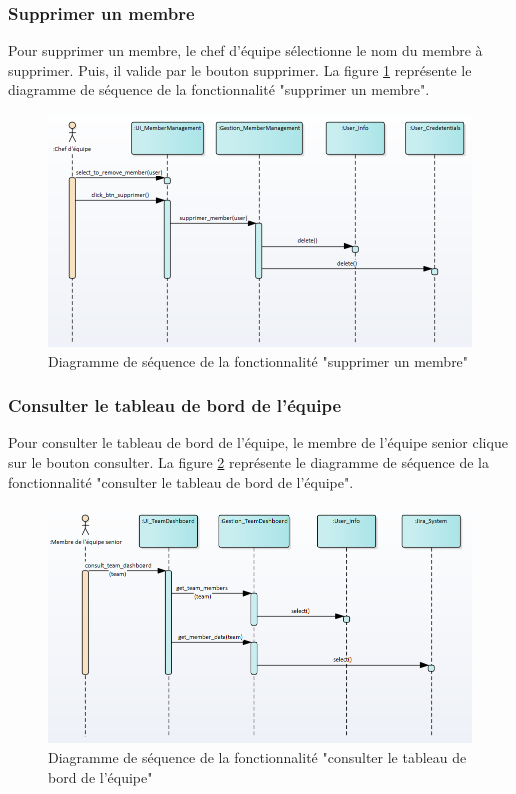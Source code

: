 \subsubsection{Supprimer un membre}
Pour supprimer un membre, le chef d'équipe sélectionne le nom du membre à supprimer. Puis, il valide par le bouton supprimer.
La figure \ref{code73} représente le diagramme de séquence de la fonctionnalité "supprimer un membre".
\begin{figure}[H]
  \centering
 \includegraphics[scale=0.69]{figures/diagrams/sequence/deletemember_seq_diag.png}
 \caption{Diagramme de séquence de la fonctionnalité "supprimer un membre"}
 \label{code73}
\end{figure}

\subsubsection{Consulter le tableau de bord de l'équipe}
Pour consulter le tableau de bord de l'équipe, le membre de l'équipe senior clique sur le bouton consulter.
La figure \ref{code74} représente le diagramme de séquence de la fonctionnalité "consulter le tableau de bord de l'équipe".
\begin{figure}[H]
  \centering
 \includegraphics[scale=0.69]{figures/diagrams/sequence/teamdashboard_seq_diag.png}
 \caption{Diagramme de séquence de la fonctionnalité "consulter le tableau de bord de l'équipe"}
 \label{code74}
\end{figure}

